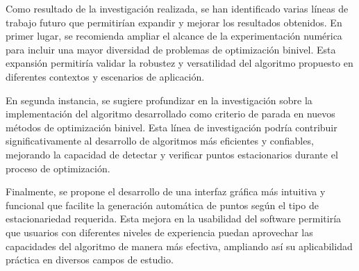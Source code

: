 \begin{recomendations}
        Como resultado de la investigación realizada, se han identificado varias líneas de trabajo futuro que permitirían expandir y mejorar los resultados obtenidos. En primer lugar, se recomienda ampliar el alcance de la experimentación numérica para incluir una mayor diversidad de problemas de optimización binivel. Esta expansión permitiría validar la robustez y versatilidad del algoritmo propuesto en diferentes contextos y escenarios de aplicación.
    
        En segunda instancia, se sugiere profundizar en la investigación sobre la implementación del algoritmo desarrollado como criterio de parada en nuevos métodos de optimización binivel. Esta línea de investigación podría contribuir significativamente al desarrollo de algoritmos más eficientes y confiables, mejorando la capacidad de detectar y verificar puntos estacionarios durante el proceso de optimización.
        
        Finalmente, se propone el desarrollo de una interfaz gráfica más intuitiva y funcional que facilite la generación automática de puntos según el tipo de estacionariedad requerida. Esta mejora en la usabilidad del software permitiría que usuarios con diferentes niveles de experiencia puedan aprovechar las capacidades del algoritmo de manera más efectiva, ampliando así su aplicabilidad práctica en diversos campos de estudio.
\end{recomendations}
